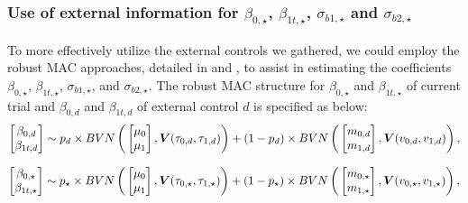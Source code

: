 \subsubsection{\texorpdfstring{Use of external information for $\beta_{0, \star}$, $\beta_{1t,\star}$, $\sigma_{b1,\star}$ and $\sigma_{b2,\star}$}{Use of external information for certain parameters}} \label{sec:external}
To more effectively utilize the external controls we gathered, we could employ the robust \ac{MAC} approaches, detailed in \cite{neuenschwander2016use} and \cite{wang2023dynamic}, to assist in estimating the coefficients $\beta_{0, \star}$, $\beta_{1t, \star}$, $\sigma_{b1, \star}$, and $\sigma_{b2, \star}$. The robust \ac{MAC} structure for $\beta_{0,\star}$ and $\beta_{1t, \star}$ of current trial and $\beta_{0,d}$ and $\beta_{1t,d}$ of external control $d$ is specified as below:
\begin{equation}\label{eq:BLPM}
\begin{bmatrix} \beta_{0,d} \\ \beta_{1t,d} \end{bmatrix} \sim p_d \times BVN\left(\\ \begin{bmatrix} \mu_{0} \\ \mu_{1}\end{bmatrix}, \boldsymbol{V}(\tau_{0,d}, \tau_{1,d})\right) 
+ (1 - p_d) \times BVN\left(\\ \begin{bmatrix} m_{0,d} \\ m_{1,d}\end{bmatrix}, \boldsymbol{V}(v_{0,d}, v_{1,d})\right),
\end{equation}   

\begin{equation}\label{eq:mac}
\begin{bmatrix} \beta_{0,\star} \\ \beta_{1t,\star} \end{bmatrix} \sim p_\star \times BVN\left(\\ \begin{bmatrix} \mu_{0} \\ \mu_{1}\end{bmatrix}, \boldsymbol{V}(\tau_{0,\star}, \tau_{1,\star})\right) 
+ (1 - p_\star) \times BVN\left(\\ \begin{bmatrix} m_{0,\star} \\ m_{1,\star}\end{bmatrix}, \boldsymbol{V}(v_{0,\star}, v_{1,\star})\right),
\end{equation}   

